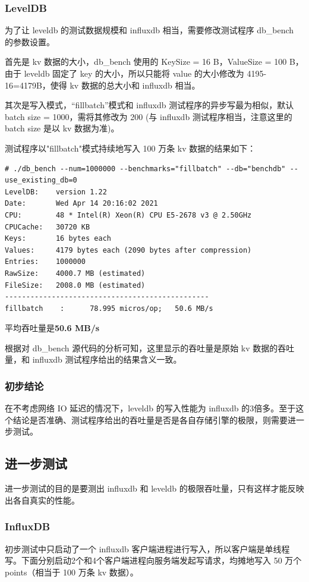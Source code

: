 \documentclass{article}
\begin{document}
\subsubsection{LevelDB}
为了让 leveldb 的测试数据规模和 influxdb 相当，需要修改测试程序 db\_bench 的参数设置。

首先是 kv 数据的大小，db\_bench 使用的 KeySize = 16 B，ValueSize = 100 B，由于 leveldb 固定了 key 的大小，所以只能将 value 的大小修改为 4195-16=4179B，使得 kv 数据的总大小和 influxdb 相当。

其次是写入模式，``fillbatch''模式和 influxdb 测试程序的异步写最为相似，默认 batch size = 1000，需将其修改为 200 (与 influxdb 测试程序相当，注意这里的 batch size 是以 kv 数据为准)。

测试程序以"fillbatch"模式持续地写入 100 万条 kv 数据的结果如下：
\begin{lstlisting}
# ./db_bench --num=1000000 --benchmarks="fillbatch" --db="benchdb" --use_existing_db=0
LevelDB:    version 1.22
Date:       Wed Apr 14 20:16:02 2021
CPU:        48 * Intel(R) Xeon(R) CPU E5-2678 v3 @ 2.50GHz
CPUCache:   30720 KB
Keys:       16 bytes each
Values:     4179 bytes each (2090 bytes after compression)
Entries:    1000000
RawSize:    4000.7 MB (estimated)
FileSize:   2008.0 MB (estimated)
------------------------------------------------
fillbatch    :      78.995 micros/op;   50.6 MB/s
\end{lstlisting}

平均吞吐量是\textbf{50.6 MB/s}

根据对 db\_bench 源代码的分析可知，这里显示的吞吐量是原始 kv 数据的吞吐量，和 influxdb 测试程序给出的结果含义一致。

\subsubsection{初步结论}
在不考虑网络 IO 延迟的情况下，leveldb 的写入性能为 influxdb 的3倍多。至于这个结论是否准确、测试程序给出的吞吐量是否是各自存储引擎的极限，则需要进一步测试。

\subsection{进一步测试}
进一步测试的目的是要测出 influxdb 和 leveldb 的极限吞吐量，只有这样才能反映出各自真实的性能。

\subsubsection{InfluxDB}
初步测试中只启动了一个 influxdb 客户端进程进行写入，所以客户端是单线程写。下面分别启动2个和4个客户端进程向服务端发起写请求，均摊地写入 50 万个 points（相当于 100 万条 kv 数据）。
\end{document}
